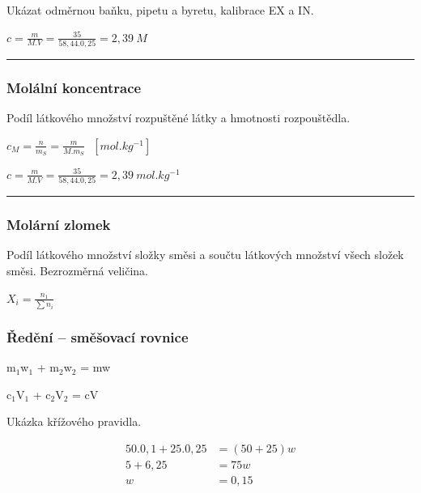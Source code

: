 Ukázat odměrnou baňku, pipetu a byretu, kalibrace EX a IN.


$c = \frac{m}{M . V} = \frac{35}{58,44 . 0,25} = 2,39\ M$
\hrule

\subsubsection{Molální koncentrace}

Podíl látkového množství rozpuštěné látky a hmotnosti rozpouštědla.

$c_M = \frac{n}{m_S} = \frac{m}{M . m_S}\ \ \ [mol.kg^{-1}]$


$c = \frac{m}{M . V} = \frac{35}{58,44 . 0,25} = 2,39\ mol.kg^{-1}$
\hrule

\clearpage
\subsubsection{Molární zlomek}

Podíl látkového množství složky směsi a součtu látkových množství všech složek směsi. Bezrozměrná veličina.

$X_i = \frac{n_1}{\sum n_i}$

\subsubsection{Ředění -- směšovací rovnice}

m$_1$w$_1$ + m$_2$w$_2$ = mw

c$_1$V$_1$ + c$_2$V$_2$ = cV

Ukázka křížového pravidla.


\begin{align*}
	50 . 0,1 + 25 . 0,25 &= (50+25)w\\
	5 + 6,25 &= 75w\\
	w &= 0,15
\end{align*}


